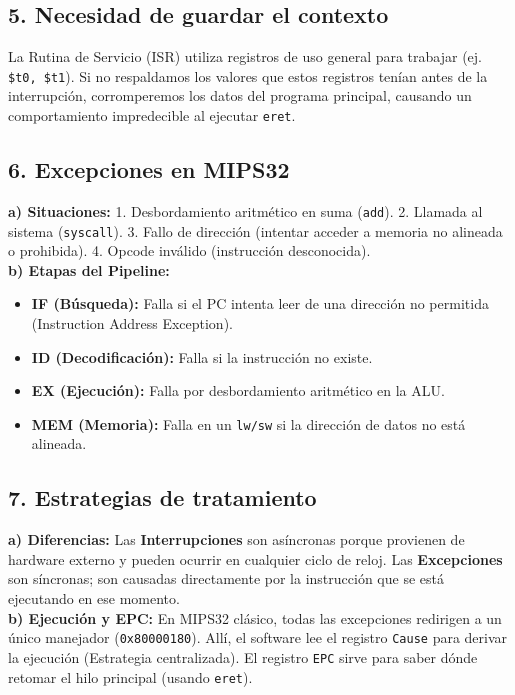\documentclass[12pt, a4paper]{article}
\begin{document}
\subsection{5. Necesidad de guardar el contexto}
La Rutina de Servicio (ISR) utiliza registros de uso general para trabajar (ej. \texttt{\$t0, \$t1}). Si no respaldamos los valores que estos registros tenían antes de la interrupción, corromperemos los datos del programa principal, causando un comportamiento impredecible al ejecutar \texttt{eret}.

\subsection{6. Excepciones en MIPS32}
\textbf{a) Situaciones:} 1. Desbordamiento aritmético en suma (\texttt{add}). 2. Llamada al sistema (\texttt{syscall}). 3. Fallo de dirección (intentar acceder a memoria no alineada o prohibida). 4. Opcode inválido (instrucción desconocida).\\
\textbf{b) Etapas del Pipeline:}
\begin{itemize}
    \item \textbf{IF (Búsqueda):} Falla si el PC intenta leer de una dirección no permitida (Instruction Address Exception).
    \item \textbf{ID (Decodificación):} Falla si la instrucción no existe.
    \item \textbf{EX (Ejecución):} Falla por desbordamiento aritmético en la ALU.
    \item \textbf{MEM (Memoria):} Falla en un \texttt{lw/sw} si la dirección de datos no está alineada.
\end{itemize}

\subsection{7. Estrategias de tratamiento}
\textbf{a) Diferencias:} Las \textbf{Interrupciones} son asíncronas porque provienen de hardware externo y pueden ocurrir en cualquier ciclo de reloj. Las \textbf{Excepciones} son síncronas; son causadas directamente por la instrucción que se está ejecutando en ese momento.\\
\textbf{b) Ejecución y EPC:} En MIPS32 clásico, todas las excepciones redirigen a un único manejador (\texttt{0x80000180}). Allí, el software lee el registro \texttt{Cause} para derivar la ejecución (Estrategia centralizada). El registro \texttt{EPC} sirve para saber dónde retomar el hilo principal (usando \texttt{eret}).
\end{document}
